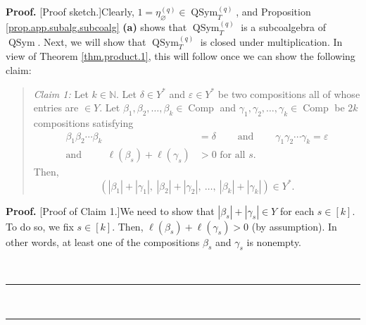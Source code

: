 \documentclass[numbers=enddot,12pt,final,onecolumn,notitlepage]{scrartcl}%
\theoremstyle{definition}
\newenvironment{statement}{\begin{quote}}{\end{quote}}
\newenvironment{proof}[1][Proof]{\noindent\textbf{#1.} }{\ \rule{0.5em}{0.5em}}
\begin{document}
\begin{proof}
[Proof sketch.]Clearly, $1=\eta_{\varnothing}^{\left(  q\right)  }%
\in\operatorname*{QSym}\nolimits_{T}^{\left(  q\right)  }$, and Proposition
\ref{prop.app.subalg.subcoalg} \textbf{(a)} shows that $\operatorname*{QSym}%
\nolimits_{T}^{\left(  q\right)  }$ is a subcoalgebra of $\operatorname*{QSym}%
$. Next, we will show that $\operatorname*{QSym}\nolimits_{T}^{\left(
q\right)  }$ is closed under multiplication. In view of Theorem
\ref{thm.product.1}, this will follow once we can show the following claim:

\begin{statement}
\textit{Claim 1:} Let $k\in\mathbb{N}$. Let $\delta\in Y^{\ast}$ and
$\varepsilon\in Y^{\ast}$ be two compositions all of whose entries are $\in
Y$. Let $\beta_{1},\beta_{2},\ldots,\beta_{k}\in\operatorname*{Comp}$ and
$\gamma_{1},\gamma_{2},\ldots,\gamma_{k}\in\operatorname*{Comp}$ be $2k$
compositions satisfying%
\begin{align*}
\beta_{1}\beta_{2}\cdots\beta_{k}  &  =\delta\ \ \ \ \ \ \ \ \ \ \text{and}%
\ \ \ \ \ \ \ \ \ \ \gamma_{1}\gamma_{2}\cdots\gamma_{k}=\varepsilon\\
\text{and }\ \ \ \ \ \ \ \ \ \ \ell\left(  \beta_{s}\right)  +\ell\left(
\gamma_{s}\right)   &  >0\text{ for all }s.
\end{align*}
Then,
\[
\left(  \left\vert \beta_{1}\right\vert +\left\vert \gamma_{1}\right\vert
,\ \left\vert \beta_{2}\right\vert +\left\vert \gamma_{2}\right\vert
,\ \ldots,\ \left\vert \beta_{k}\right\vert +\left\vert \gamma_{k}\right\vert
\right)  \in Y^{\ast}.
\]

\end{statement}

\begin{proof}
[Proof of Claim 1.]We need to show that $\left\vert \beta_{s}\right\vert
+\left\vert \gamma_{s}\right\vert \in Y$ for each $s\in\left[  k\right]  $. To
do so, we fix $s\in\left[  k\right]  $. Then, $\ell\left(  \beta_{s}\right)
+\ell\left(  \gamma_{s}\right)  >0$ (by assumption). In other words, at least
one of the compositions $\beta_{s}$ and $\gamma_{s}$ is nonempty.


\end{proof}
\end{proof}
\end{document}
